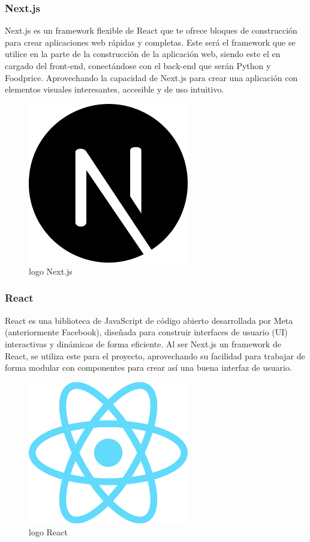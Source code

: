 \subsubsection{Next.js}
\noindent Next.js es un framework flexible de React que te ofrece bloques de construcci\'on para crear aplicaciones web r\'apidas y completas\cite{ReactFoundationsReact}. Este ser\'a el framework que se utilice en la parte de la construcci\'on de la aplicaci\'on web, siendo este el en cargado del front-end, conect\'andose con el back-end que ser\'an Python y Foodprice. Aprovechando la capacidad de Next.js para crear una aplicaci\'on con elementos visuales interesantes, accesible y de uso intuitivo.

\begin{figure}[H]
        \centering
        \includegraphics[width=7cm]{img/metodologia/nextjs-icon-1024x1024-5et230l7.png}
        \caption{logo Next.js}
        \label{fig:logoNext}
    \end{figure}

\subsubsection{React}
\noindent React es una biblioteca de JavaScript de c\'odigo abierto desarrollada por Meta (anteriormente Facebook), dise\~{n}ada para construir interfaces de usuario (UI) interactivas y din\'amicas de forma eficiente\cite{React}. Al ser Next.js un framework de React, se utiliza este para el proyecto, aprovechando su facilidad para trabajar de forma modular con componentes para crear as\'i una buena interfaz de usuario.

\begin{figure}[H]
        \centering
        \includegraphics[width=7cm]{img/metodologia/React-icon.svg.png}
        \caption{logo React}
        \label{fig:logoReact}
    \end{figure}

